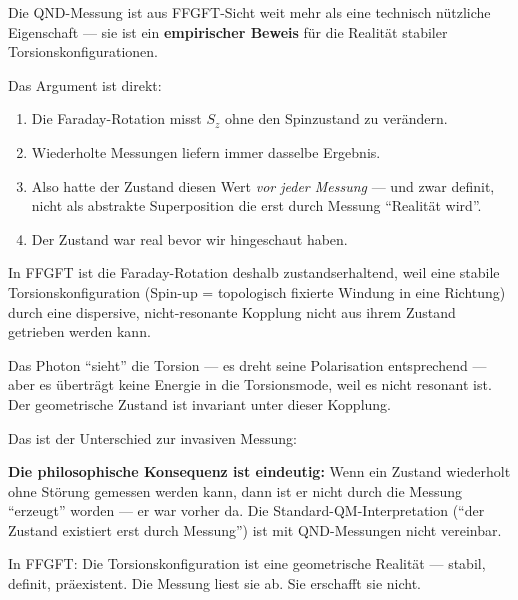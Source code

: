 Die QND-Messung ist aus FFGFT-Sicht weit mehr
als eine technisch nützliche Eigenschaft ---
sie ist ein \textbf{empirischer Beweis}
für die Realität stabiler Torsionskonfigurationen.

Das Argument ist direkt:

\begin{enumerate}
  \item Die Faraday-Rotation misst $S_z$ ohne den
    Spinzustand zu verändern.
  \item Wiederholte Messungen liefern immer dasselbe Ergebnis.
  \item Also hatte der Zustand diesen Wert
    \emph{vor jeder Messung} --- und zwar definit,
    nicht als abstrakte Superposition die erst durch
    Messung ``Realität wird''.
  \item Der Zustand war real bevor wir hingeschaut haben.
\end{enumerate}

\begin{foundation}
In FFGFT ist die Faraday-Rotation deshalb zustandserhaltend,
weil eine stabile Torsionskonfiguration
(Spin-up = topologisch fixierte Windung in eine Richtung)
durch eine dispersive, nicht-resonante Kopplung
nicht aus ihrem Zustand getrieben werden kann.

Das Photon ``sieht'' die Torsion --- es dreht seine
Polarisation entsprechend --- aber es überträgt keine
Energie in die Torsionsmode, weil es nicht resonant ist.
Der geometrische Zustand ist invariant unter dieser Kopplung.

Das ist der Unterschied zur invasiven Messung:
\begin{center}
\end{center}

\textbf{Die philosophische Konsequenz ist eindeutig:}
Wenn ein Zustand wiederholt ohne Störung gemessen
werden kann, dann ist er nicht durch die Messung
``erzeugt'' worden --- er war vorher da.
Die Standard-QM-Interpretation
(``der Zustand existiert erst durch Messung'')
ist mit QND-Messungen nicht vereinbar.

In FFGFT: Die Torsionskonfiguration ist eine
geometrische Realität --- stabil, definit, präexistent.
Die Messung liest sie ab. Sie erschafft sie nicht.
\end{foundation}


